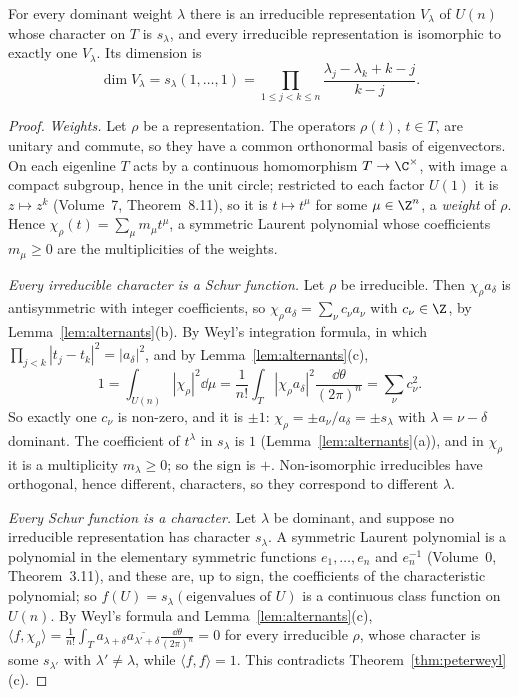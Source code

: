\begin{theorem}\label{thm:weylchar}
For every dominant weight $\lambda$ there is an irreducible representation $V_\lambda$ of $U(n)$ whose character on $T$ is $s_\lambda$, and every irreducible representation is isomorphic to exactly one $V_\lambda$. Its dimension is
\[
\dim V_\lambda=s_\lambda(1,\dots,1)=\prod_{1\le j<k\le n}\frac{\lambda_j-\lambda_k+k-j}{k-j}.
\]
\end{theorem}

\begin{proof}
\emph{Weights.} Let $\rho$ be a representation. The operators $\rho(t)$, $t\in T$, are unitary and commute, so they have a common orthonormal basis of eigenvectors. On each eigenline $T$ acts by a continuous homomorphism $T\to\C^\times$, with image a compact subgroup, hence in
the unit circle; restricted to each factor $U(1)$ it is $z\mapsto z^{k}$ (Volume~7, Theorem~8.11), so it is $t\mapsto t^\mu$ for some $\mu\in\Z^n$, a \emph{weight} of $\rho$. Hence $\chi_\rho(t)=\sum_\mu m_\mu t^\mu$, a symmetric Laurent polynomial whose
coefficients $m_\mu\ge0$ are the multiplicities of the weights.

\emph{Every irreducible character is a Schur function.} Let $\rho$ be irreducible. Then $\chi_\rho a_\delta$ is antisymmetric with integer coefficients, so $\chi_\rho a_\delta=\sum_\nu c_\nu a_\nu$ with $c_\nu\in\Z$, by Lemma~\ref{lem:alternants}(b). By Weyl's integration formula,
in which $\prod_{j<k}|t_j-t_k|^2=|a_\delta|^2$, and by Lemma~\ref{lem:alternants}(c),
\[
1=\int_{U(n)}|\chi_\rho|^2\dd\mu=\frac1{n!}\int_T|\chi_\rho a_\delta|^2\frac{\dd\theta}{(2\pi)^n}=\sum_\nu c_\nu^2.
\]
So exactly one $c_\nu$ is non-zero, and it is $\pm1$: $\chi_\rho=\pm a_\nu/a_\delta=\pm s_\lambda$ with $\lambda=\nu-\delta$ dominant. The coefficient of $t^\lambda$ in $s_\lambda$ is $1$ (Lemma~\ref{lem:alternants}(a)), and in $\chi_\rho$ it is a multiplicity $m_\lambda\ge0$; so the sign is
$+$. Non-isomorphic irreducibles have orthogonal, hence different, characters, so they correspond to different $\lambda$.

\emph{Every Schur function is a character.} Let $\lambda$ be dominant, and suppose no irreducible representation has character $s_\lambda$. A symmetric Laurent polynomial is a polynomial in the elementary symmetric functions $e_1,\dots,e_n$ and $e_n^{-1}$
(Volume~0, Theorem~3.11), and these are, up to sign, the coefficients of the characteristic polynomial; so $f(U)=s_\lambda(\text{eigenvalues of }U)$ is a continuous class function on $U(n)$. By Weyl's formula and
Lemma~\ref{lem:alternants}(c), $\langle f,\chi_\rho\rangle=\frac1{n!}\int_Ta_{\lambda+\delta}\overline{a_{\lambda'+\delta}}\frac{\dd\theta}{(2\pi)^n}=0$ for every irreducible $\rho$, whose character is some $s_{\lambda'}$ with $\lambda'\ne\lambda$, while $\langle f,f\rangle=1$. This contradicts
Theorem~\ref{thm:peterweyl}(c).


\end{proof}
